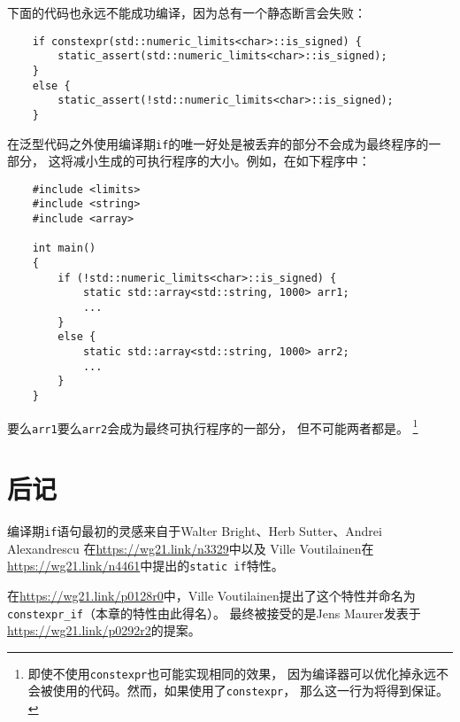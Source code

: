 下面的代码也永远不能成功编译，因为总有一个静态断言会失败：
\begin{lstlisting}
    if constexpr(std::numeric_limits<char>::is_signed) {
        static_assert(std::numeric_limits<char>::is_signed);
    }
    else {
        static_assert(!std::numeric_limits<char>::is_signed);
    }
\end{lstlisting}
在泛型代码之外使用编译期\texttt{if}的唯一好处是被丢弃的部分不会成为最终程序的一部分，
这将减小生成的可执行程序的大小。例如，在如下程序中：
\begin{lstlisting}
    #include <limits>
    #include <string>
    #include <array>

    int main()
    {
        if (!std::numeric_limits<char>::is_signed) {
            static std::array<std::string, 1000> arr1;
            ...
        }
        else {
            static std::array<std::string, 1000> arr2;
            ...
        }
    }
\end{lstlisting}
要么\texttt{arr1}要么\texttt{arr2}会成为最终可执行程序的一部分，
但不可能两者都是。
\footnote{即使不使用\texttt{constexpr}也可能实现相同的效果，
因为编译器可以优化掉永远不会被使用的代码。然而，如果使用了\texttt{constexpr}，
那么这一行为将得到保证。}

\section{后记}
编译期\texttt{if}语句最初的灵感来自于Walter Bright、Herb Sutter、Andrei Alexandrescu
在\url{https://wg21.link/n3329}中以及
Ville Voutilainen在\url{https://wg21.link/n4461}中提出的\texttt{static if}特性。

在\url{https://wg21.link/p0128r0}中，Ville Voutilainen提出了这个特性并命名为
\texttt{constexpr\_if}（本章的特性由此得名）。
最终被接受的是Jens Maurer发表于\url{https://wg21.link/p0292r2}的提案。